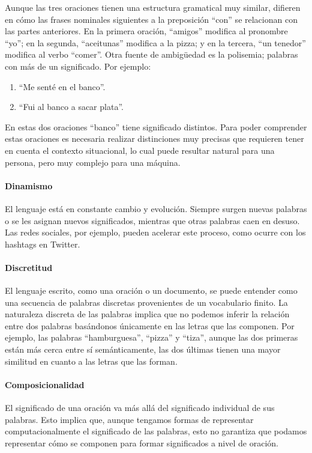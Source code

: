 Aunque las tres oraciones tienen una estructura gramatical muy similar, difieren en cómo las frases nominales siguientes a la preposición ``con'' se relacionan con las partes anteriores. En la primera oración, ``amigos'' modifica al pronombre ``yo''; en la segunda, ``aceitunas'' modifica a la pizza; y en la tercera, ``un tenedor'' modifica al verbo ``comer''. Otra fuente de ambigüedad es la polisemia; palabras con más de un significado. Por ejemplo:
\begin{enumerate}
 \item ``Me senté en el banco''.
 \item ``Fui al banco a sacar plata''.
\end{enumerate}
 En estas dos oraciones ``banco'' tiene significado distintos. Para poder comprender estas oraciones es necesaria realizar  distinciones muy precisas que requieren tener en cuenta el contexto situacional, lo cual puede resultar natural para una persona, pero muy complejo para una máquina.

\paragraph{Dinamismo}

El lenguaje está en constante cambio y evolución. Siempre surgen nuevas palabras o se les asignan nuevos significados, mientras que otras palabras caen en desuso. Las redes sociales, por ejemplo, pueden acelerar este proceso, como ocurre con los hashtags en Twitter.

\paragraph{Discretitud}

El lenguaje escrito, como una oración o un documento, se puede entender como una secuencia de palabras discretas provenientes de un vocabulario finito. La naturaleza discreta de las palabras implica que no podemos inferir la relación entre dos palabras basándonos únicamente en las letras que las componen. Por ejemplo, las palabras ``hamburguesa'', ``pizza'' y ``tiza'', aunque las dos primeras están más cerca entre sí semánticamente, las dos últimas tienen una mayor similitud en cuanto a las letras que las forman.

\paragraph{Composicionalidad}
El significado de una oración va más allá del significado individual de sus palabras. Esto implica que, aunque tengamos formas de representar computacionalmente el significado de las palabras, esto no garantiza que podamos representar cómo se componen para formar significados a nivel de oración.

